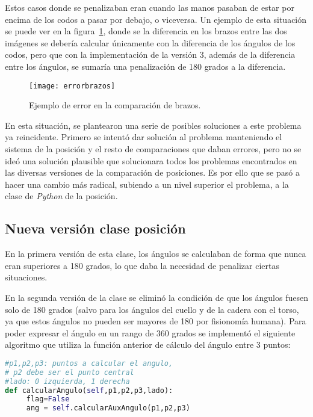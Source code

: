 {Estos casos donde se penalizaban eran cuando las manos pasaban de estar por encima de los codos a pasar por debajo, o viceversa. Un ejemplo de esta situación se puede ver en la figura~\ref{fig:errorbrazos}, donde se la diferencia en los brazos entre las dos imágenes se debería calcular únicamente con la diferencia de los ángulos de los codos, pero que con la implementación de la versión 3, además de la diferencia entre los ángulos, se sumaría una penalización de 180 grados a la diferencia.

\begin{figure}[h]
	\centering
	\texttt{[image: errorbrazos]}
	\caption{Ejemplo de error en la comparación de brazos.}
	\label{fig:errorbrazos}
\end{figure}

En esta situación, se plantearon una serie de posibles soluciones a este problema ya reincidente. Primero se intentó dar solución al problema manteniendo el sistema de la posición y el resto de comparaciones que daban errores, pero no se ideó una solución plausible que solucionara todos los problemas encontrados en las diversas versiones de la comparación de posiciones. Es por ello que se pasó a hacer una cambio más radical, subiendo a un nivel superior el problema, a la clase de \textit{Python} de la posición.

\subsection{Nueva versión clase posición}

En la primera versión de esta clase, los ángulos se calculaban de forma que nunca eran superiores a 180 grados, lo que daba la necesidad de penalizar ciertas situaciones.

En la segunda versión de la clase se eliminó la condición de que los ángulos fuesen solo de 180 grados (salvo para los ángulos del cuello y de la cadera con el torso, ya que estos ángulos no pueden ser mayores de 180 por fisionomía humana). Para poder expresar el ángulo en un rango de 360 grados se implementó el siguiente algoritmo que utiliza la función anterior de cálculo del ángulo entre 3 puntos:

\begin{lstlisting}[language=Python]
#p1,p2,p3: puntos a calcular el angulo,
# p2 debe ser el punto central
#lado: 0 izquierda, 1 derecha
def calcularAngulo(self,p1,p2,p3,lado):
     flag=False
     ang = self.calcularAuxAngulo(p1,p2,p3)
     

\end{lstlisting}}
